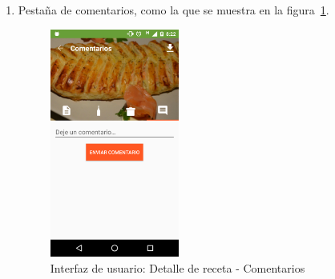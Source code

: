 \begin{enumerate}
\item Pestaña de comentarios, como la que se muestra en la
  figura~\ref{fig:captura_12}.

  \begin{figure}[htbp]
    \centering
    \includegraphics[width=0.4\textwidth]{cap5/img/captura_12}
    \caption{Interfaz de usuario: Detalle de receta - Comentarios}
    \label{fig:captura_12}
  \end{figure}
\end{enumerate}



